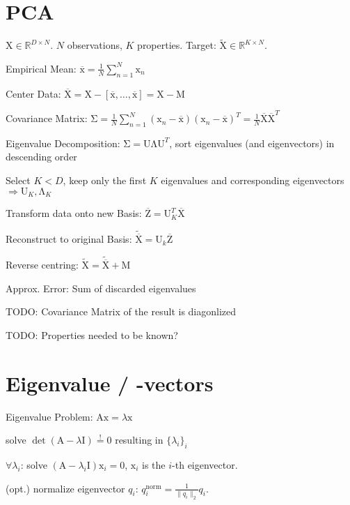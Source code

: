 \documentclass[a4paper, 11pt, landscape]{article}
\newcommand{\matr}[1]{\boldsymbol{\mathrm{#1}}}
\begin{document}
\begin{multicols*}{3}

\section{PCA}
$\matr{X} \in \mathbb{R}^{D \times N}$. $N$ observations, $K$ properties. Target: $\tilde{\matr{X}} \in \mathbb{R}^{K \times N}$.
\begin{compactenum}
	\item Empirical Mean: $\overline{\matr{x}} = \frac{1}{N} \sum_{n=1}^N \matr{x}_n$
	\item Center Data: $\overline{\matr{X}} = \matr{X} - [\overline{\matr{x}}, \ldots, \overline{\matr{x}}] = \matr{X} - \matr{M}$
	\item Covariance Matrix: $\matr{\Sigma} = \frac{1}{N	} \sum_{n=1}^N (\matr{x}_n - \overline{\matr{x}}) (\matr{x}_n - \overline{\matr{x}})^T = \frac{1}{N} \overline{\matr{X}}\overline{\matr{X}}^T$
	\item Eigenvalue Decomposition: $\matr{\Sigma} = \matr{U \Lambda U}^T$, sort eigenvalues (and eigenvectors) in descending order
	\item Select $K < D$, keep only the first $K$ eigenvalues and corresponding eigenvectors $\Rightarrow \matr{U}_K, \matr{\Lambda}_K$
	\item Transform data onto new Basis: $\overline{\matr{Z}} = \matr{U}_K^T \overline{\matr{X}}$
	\item Reconstruct to original Basis: $\tilde{\overline{\matr{X}}} = \matr{U}_k \overline{\matr{Z}}$
	\item Reverse centring: $\tilde{\matr{X}} = \tilde{\overline{\matr{X}}} + \matr{M}$
\end{compactenum}

\begin{compactdesc}
	\item[Approx. Error:] Sum of discarded eigenvalues
\end{compactdesc}

\begin{compactitem}
	\item TODO: Covariance Matrix of the result is diagonlized
	\item TODO: Properties needed to be known?
\end{compactitem}

\section{Eigenvalue / -vectors}
Eigenvalue Problem: $\matr{Ax} = \lambda \matr{x}$
\begin{compactenum}
	\item solve $\operatorname{det}(\matr{A} - \lambda \matr{I}) \overset{!}{=} 0$ resulting in $\{\lambda_i\}_i$
	\item $\forall \lambda_i$:
		solve $(\matr{A} - \lambda_i \matr{I}) \matr{x}_i = \matr{0}$, $\matr{x}_i$ is the $i$-th eigenvector.
	\item (opt.) normalize eigenvector $q_i$: $q_i^{\text{norm}} = \frac{1}{\|q_i\|_2} q_i$.
\end{compactenum}


\end{multicols*}
\end{document}
